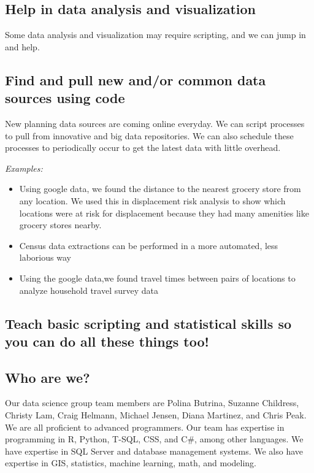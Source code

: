 \documentclass[
]{article}
\providecommand{\tightlist}{%
  \setlength{\itemsep}{0pt}\setlength{\parskip}{0pt}}
\begin{document}
\hypertarget{help-in-data-analysis-and-visualization}{%
\subsection{Help in data analysis and
visualization}\label{help-in-data-analysis-and-visualization}}

Some data analysis and visualization may require scripting, and we can
jump in and help.

\hypertarget{find-and-pull-new-andor-common-data-sources-using-code}{%
\subsection{Find and pull new and/or common data sources using
code}\label{find-and-pull-new-andor-common-data-sources-using-code}}

New planning data sources are coming online everyday. We can script
processes to pull from innovative and big data repositories. We can also
schedule these processes to periodically occur to get the latest data
with little overhead.

\emph{Examples:}

\begin{itemize}
\tightlist
\item
  Using google data, we found the distance to the nearest grocery store
  from any location. We used this in displacement risk analysis to show
  which locations were at risk for displacement because they had many
  amenities like grocery stores nearby.
\item
  Census data extractions can be performed in a more automated, less
  laborious way
\item
  Using the google data,we found travel times between pairs of locations
  to analyze household travel survey data
\end{itemize}

\hypertarget{teach-basic-scripting-and-statistical-skills-so-you-can-do-all-these-things-too}{%
\subsection{Teach basic scripting and statistical skills so you can do
all these things
too!}\label{teach-basic-scripting-and-statistical-skills-so-you-can-do-all-these-things-too}}

\hypertarget{who-are-we}{%
\subsection{Who are we?}\label{who-are-we}}

Our data science group team members are Polina Butrina, Suzanne
Childress, Christy Lam, Craig Helmann, Michael Jensen, Diana Martinez,
and Chris Peak. We are all proficient to advanced programmers. Our team
has expertise in programming in R, Python, T-SQL, CSS, and C\#, among
other languages. We have expertise in SQL Server and database management
systems. We also have expertise in GIS, statistics, machine learning,
math, and modeling.
\end{document}
